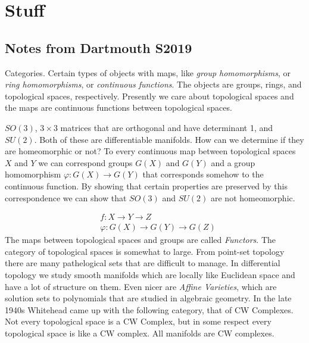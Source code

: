 \chapter{Stuff}
\section{Notes from Dartmouth S2019}
    Categories. Certain types of objects with maps, like
    \textit{group homomorphisms}, or \textit{ring homomorphisms}, or
    \textit{continuous functions}. The objects are groups, rings, and
    topological spaces, respectively. Presently we care about topological
    spaces and the maps are continuous functions between topological spaces.
    \begin{example}
        $SO(3)$, $3\times{3}$ matrices that are orthogonal and have determinant
        1, and $SU(2)$. Both of these are differentiable manifolds. How can we
        determine if they are homeomorphic or not? To every continuous map
        between topological spaces $X$ and $Y$ we can correspond groups $G(X)$
        and $G(Y)$ and a group homomorphism $\varphi:G(X)\rightarrow{G}(Y)$ that
        corresponds somehow to the continuous function. By showing that certain
        properties are preserved by this correspondence we can show that $SO(3)$
        and $SU(2)$ are not homeomorphic.
    \end{example}
    \begin{align}
        &f:X\rightarrow{Y}\rightarrow{Z}\\
        &\varphi:G(X)\rightarrow{G}(Y)\rightarrow{G}(Z)
    \end{align}
    The maps between topological spaces and groups are called \textit{Functors}.
    The category of topological spaces is somewhat to large. From point-set
    topology there are many pathelogical sets that are difficult to manage. In
    differential topology we study smooth manifolds which are locally like
    Euclidean space and have a lot of structure on them. Even nicer are
    \textit{Affine Varieties}, which are solution sets to polynomials that are
    studied in algebraic geometry. In the late 1940s Whitehead came up with the
    following category, that of CW Complexes. Not every topological space is a
    CW Complex, but in some respect every topological space is like a CW
    complex. All manifolds are CW complexes.
